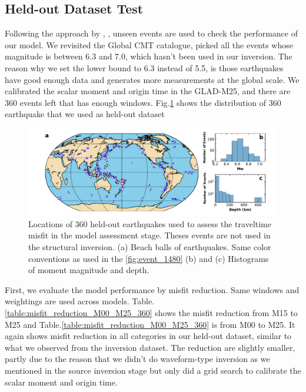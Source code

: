 \documentclass[extra,mreferee]{gji}
\begin{document}
\subsection{Held-out Dataset Test}
Following the approach by \cite{tape2009adjoint}, \cite{bozdaug2016global},
unseen events are used to check the performance of our
model. We revisited the Global CMT catalogue,
picked all the events whose magnitude is between 6.3 and 7.0, which hasn't
been used in our inversion. The reason why we set the lower bound to 6.3
instead of 5.5, is those earthquakes have good enough data and generates
more measurements at the global scale.
We calibrated the scalar moment and origin time in the GLAD-M25, and there
are 360 events left that has enough windows. Fig.\ref{fig:events_360} shows
the distribution of 360 earthquake that we used as held-out dataset

\begin{figure}
  \centering
  \includegraphics[width=\textwidth]{figures/events_360.pdf}
  \caption{Locations of 360 held-out earthquakes used to assess the traveltime misfit in the model assessment stage. Theses events are not used in the structural inversion. (a) Beach balls of earthquakes. Same color conventions as used in the \ref{fig:event_1480} (b) and (c) Histograms of moment magnitude and depth.}
  \label{fig:events_360}
\end{figure}

First, we evaluate the model performance by misfit reduction. Same windows and
weightings are used across models. Table.\ref{table:misfit_reduction_M00_M25_360}
shows the misfit reduction from M15 to M25 and Table.\ref{table:misfit_reduction_M00_M25_360}
is from M00 to M25. It again shows misfit reduction in all categories in
our held-out dataset, similar to what we observed from the inversion dataset.
The reduction are slightly smaller, partly due to the reason that we didn't
do waveform-type inversion as we mentioned in the source inversion stage but
only did a grid search to calibrate the scalar moment and origin time.
\end{document}
